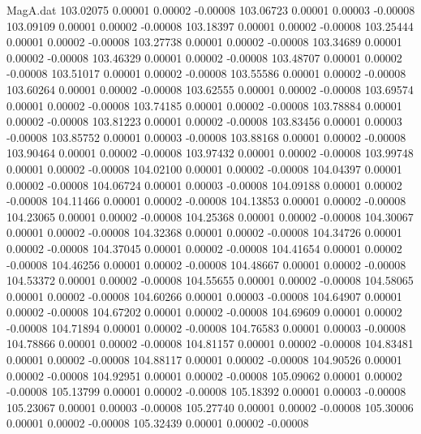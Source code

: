 \begin{filecontents}{MagA.dat}
 103.02075    0.00001    0.00002   -0.00008
 103.06723    0.00001    0.00003   -0.00008
 103.09109    0.00001    0.00002   -0.00008
 103.18397    0.00001    0.00002   -0.00008
 103.25444    0.00001    0.00002   -0.00008
 103.27738    0.00001    0.00002   -0.00008
 103.34689    0.00001    0.00002   -0.00008
 103.46329    0.00001    0.00002   -0.00008
 103.48707    0.00001    0.00002   -0.00008
 103.51017    0.00001    0.00002   -0.00008
 103.55586    0.00001    0.00002   -0.00008
 103.60264    0.00001    0.00002   -0.00008
 103.62555    0.00001    0.00002   -0.00008
 103.69574    0.00001    0.00002   -0.00008
 103.74185    0.00001    0.00002   -0.00008
 103.78884    0.00001    0.00002   -0.00008
 103.81223    0.00001    0.00002   -0.00008
 103.83456    0.00001    0.00003   -0.00008
 103.85752    0.00001    0.00003   -0.00008
 103.88168    0.00001    0.00002   -0.00008
 103.90464    0.00001    0.00002   -0.00008
 103.97432    0.00001    0.00002   -0.00008
 103.99748    0.00001    0.00002   -0.00008
 104.02100    0.00001    0.00002   -0.00008
 104.04397    0.00001    0.00002   -0.00008
 104.06724    0.00001    0.00003   -0.00008
 104.09188    0.00001    0.00002   -0.00008
 104.11466    0.00001    0.00002   -0.00008
 104.13853    0.00001    0.00002   -0.00008
 104.23065    0.00001    0.00002   -0.00008
 104.25368    0.00001    0.00002   -0.00008
 104.30067    0.00001    0.00002   -0.00008
 104.32368    0.00001    0.00002   -0.00008
 104.34726    0.00001    0.00002   -0.00008
 104.37045    0.00001    0.00002   -0.00008
 104.41654    0.00001    0.00002   -0.00008
 104.46256    0.00001    0.00002   -0.00008
 104.48667    0.00001    0.00002   -0.00008
 104.53372    0.00001    0.00002   -0.00008
 104.55655    0.00001    0.00002   -0.00008
 104.58065    0.00001    0.00002   -0.00008
 104.60266    0.00001    0.00003   -0.00008
 104.64907    0.00001    0.00002   -0.00008
 104.67202    0.00001    0.00002   -0.00008
 104.69609    0.00001    0.00002   -0.00008
 104.71894    0.00001    0.00002   -0.00008
 104.76583    0.00001    0.00003   -0.00008
 104.78866    0.00001    0.00002   -0.00008
 104.81157    0.00001    0.00002   -0.00008
 104.83481    0.00001    0.00002   -0.00008
 104.88117    0.00001    0.00002   -0.00008
 104.90526    0.00001    0.00002   -0.00008
 104.92951    0.00001    0.00002   -0.00008
 105.09062    0.00001    0.00002   -0.00008
 105.13799    0.00001    0.00002   -0.00008
 105.18392    0.00001    0.00003   -0.00008
 105.23067    0.00001    0.00003   -0.00008
 105.27740    0.00001    0.00002   -0.00008
 105.30006    0.00001    0.00002   -0.00008
 105.32439    0.00001    0.00002   -0.00008

\end{filecontents}
